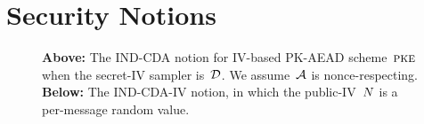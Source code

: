 \section{Security Notions}
\label{sec:notions}
\begin{figure}
\begin{center}
\caption{\textbf{Above:} The IND-CDA notion for IV-based PK-AEAD scheme~$\textsc{pke}$
  when the secret-IV sampler is~${\cal D}$.  We assume~${\cal A}$ is
  nonce-respecting. \textbf{Below:} The IND-CDA-IV notion, in which
  the public-IV~$N$ is a per-message random value.}
\label{fig:ind-cda}
\end{center}
\end{figure}
